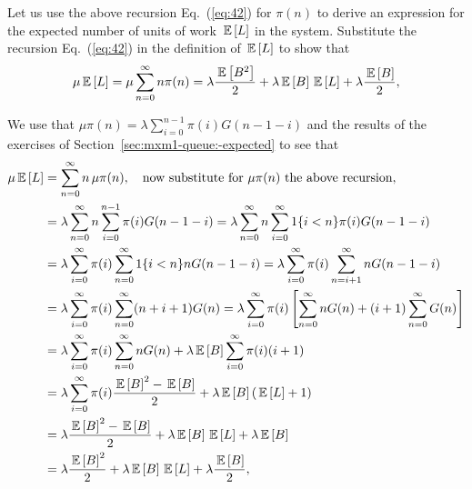 \begin{question}
  Let us use the above recursion Eq.~(\ref{eq:42}) for $\pi(n)$ to
  derive an expression for the expected number of units of work $\,\mathbb{E}\left[L\right]$
  in the system. Substitute the recursion Eq.~(\ref{eq:42}) in the
  definition of $\,\mathbb{E}\left[L\right]$ to show that
\begin{equation}\label{eq:67}
  \mu \,\mathbb{E}\left[L\right] =\mu \sum_{n=0}^\infty n \pi(n) = \lambda \frac{\,\mathbb{E}\left[B^2\right]}2  + \lambda \,\mathbb{E}\left[B\right] \,\mathbb{E}\left[L\right] +\lambda \frac{\,\mathbb{E}\left[B\right]}2,
\end{equation}


\begin{solution}
  We use that $\mu \pi(n) =\lambda \sum_{i=0}^{n-1} \pi(i) G(n-1-i)$
  and the results of the exercises of
  Section~\ref{sec:mxm1-queue:-expected} to see that
\begin{align*}
  \mu \,\mathbb{E}\left[L\right]
  &=\sum_{n=0}^\infty n\, \mu \pi(n), \quad \text{now substitute for $\mu \pi(n)$ the above recursion}, \\
& =\lambda \sum_{n=0}^\infty n \sum_{i=0}^{n-1} \pi(i) G(n-1-i) 
  =\lambda \sum_{n=0}^\infty n \sum_{i=0}^\infty 1\{i<n\} \pi(i) G(n-1-i) \\
& =\lambda \sum_{i=0}^\infty \pi(i) \sum_{n=0}^\infty 1\{i<n\} n G(n-1-i) 
  =\lambda \sum_{i=0}^\infty \pi(i) \sum_{n=i+1}^\infty n G(n-1-i) \\
& =\lambda \sum_{i=0}^\infty \pi(i) \sum_{n=0}^\infty (n+i+1) G(n) 
  =\lambda \sum_{i=0}^\infty \pi(i) \left[\sum_{n=0}^\infty n G(n) +(i+1) \sum_{n=0}^\infty G(n)\right]  \\
  &=\lambda \sum_{i=0}^\infty \pi(i)\sum_{n=0}^\infty n G(n) +\lambda  \,\mathbb{E}\left[B\right] \sum_{i=0}^\infty \pi(i) (i+1)  \\ 
  &=\lambda \sum_{i=0}^\infty \pi(i) \frac{\,\mathbb{E}\left[B\right]^2 -\,\mathbb{E}\left[B\right]}2  + \lambda \,\mathbb{E}\left[B\right] (\,\mathbb{E}\left[L\right] +1)  \\ 
  &= \lambda \frac{\,\mathbb{E}\left[B\right]^2 -\,\mathbb{E}\left[B\right]}2  + \lambda \,\mathbb{E}\left[B\right] \,\mathbb{E}\left[L\right] +\lambda \,\mathbb{E}\left[B\right] \\
  &= \lambda \frac{\,\mathbb{E}\left[B\right]^2 }2  + \lambda \,\mathbb{E}\left[B\right] \,\mathbb{E}\left[L\right] +\lambda \frac{\,\mathbb{E}\left[B\right]}2,
\end{align*}
\end{solution}
\end{question}

